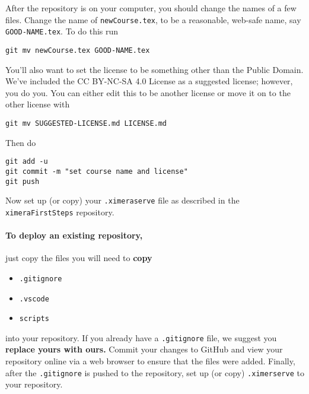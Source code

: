 \documentclass{ximera}
\begin{document}
After the repository is on your computer, you should change the names of a few files. Change the name of \verb!newCourse.tex!, to be a reasonable, web-safe name, say \verb!GOOD-NAME.tex!. 
To do this run
\begin{verbatim}
git mv newCourse.tex GOOD-NAME.tex
\end{verbatim}
You'll also want to set the license to be something other than the Public Domain. We've included the CC BY-NC-SA 4.0
License as a suggested license; however, you do you. You can either edit this to be another license or move it on to the other license with
\begin{verbatim}
git mv SUGGESTED-LICENSE.md LICENSE.md
\end{verbatim}
Then do
\begin{verbatim}
git add -u 
git commit -m "set course name and license"
git push
\end{verbatim}
Now set up (or copy) your \verb!.ximeraserve! file as described in the \verb!ximeraFirstSteps! repository. 




\paragraph{To deploy an existing repository,} just copy the files
you will need to \textbf{copy}
\begin{itemize}
  \item \texttt{.gitignore}
  \item \texttt{.vscode}
  \item \texttt{scripts}
\end{itemize}
into your repository. If you already have a \verb|.gitignore| file, we suggest
you \textbf{replace yours with ours.} Commit your changes to GitHub and view your
repository online via a web browser to ensure that the files were added.
Finally, after the \verb!.gitignore! is pushed to the repository, set up (or copy) 
\verb!.ximerserve! to your repository.
\end{document}
